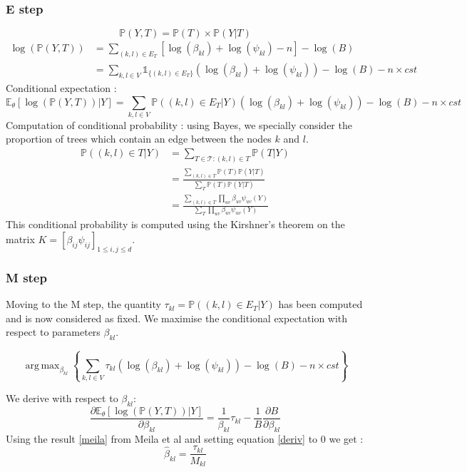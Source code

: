 \documentclass[a4paper,11pt]{article}
\DeclareMathOperator*{\argmax}{arg\,max}
\begin{document}
  \subsubsection{E step}
  \[ \mathds{P}(Y,T) = \mathds{P}(T)\times\mathds{P}(Y|T)\]
\begin{align*}
 \log(\mathds{P}(Y,T)) &= \sum_{(k,l)\in E_T} \left[ \log(\beta_{kl}) + \log(\psi_{kl}) -n \right] -\log(B) \\
 &= \sum_{k,l\in V} \mathds{1}_{\{(k,l) \in E_T\}} (\log(\beta_{kl}) + \log(\psi_{kl}) ) -\log(B) - n\times cst
 \end{align*}
  Conditional expectation :
\[ \mathds{E}_\theta[\log(\mathds{P}(Y,T))|Y] =\sum_{k,l\in V} \mathds{P}((k,l) \in E_T|Y) (\log(\beta_{kl}) + \log(\psi_{kl}) ) -\log(B) - n\times cst\]
  Computation of conditional probability : using Bayes, we specially consider the proportion of trees which contain an edge between the nodes $k$ and $l$.
 \begin{align*}
  \mathds{P}((k,l)\in T | Y)&=\sum_{T\in \mathcal{T} : (k,l)\in T}\mathds{P}( T | Y) \\
  &= \frac{\sum_{(k,l)\in T} \mathds{P}(T)\mathds{P}(Y|T)}{\sum_{T} \mathds{P}(T)\mathds{P}(Y|T)}\\
 &=\frac{\sum_{(k,l)\in T} \prod_{uv} \beta_{uv}  \psi_{uv}(Y)}{\sum_{T} \prod_{uv} \beta_{uv} \psi_{uv}(Y)}
 \end{align*}
 This conditional probability is computed using the Kirshner's theorem on the matrix $K = [\beta_{ij}\psi_{ij}]_{1\leq i, j\leq d}$.
  \subsubsection{M step}
   Moving to the M step, the quantity $\tau_{kl} =  \mathds{P}((k,l) \in E_T|Y)$ has been computed and is now considered as fixed.
We maximise the conditional expectation with respect to parameters $\beta_{kl}$.


 \[\argmax_{\beta_{kl}} \left\{\sum_{k,l\in V} \tau_{kl}(\log(\beta_{kl}) + \log(\psi_{kl}) ) -\log(B) - n\times cst\right\}\]

 We derive with respect to $\beta_{kl}$:
\begin{equation}
 \label{deriv}
 \frac{\partial\mathds{E}_\theta[\log(\mathds{P}(Y,T))|Y]}{\partial\beta_{kl}} =\frac{1 }{\beta_{kl}} \tau_{kl} - \frac{1}{B}
\frac{\partial B}{\partial\beta_{kl}}
\end{equation}
Using the result \ref{meila} from Meila et al and setting equation \ref{deriv} to 0 we get :
\[\boxed{\hat{\beta}_{kl} = \frac{\tau_{kl}}{M_{kl}}}\]
 


\end{document}
